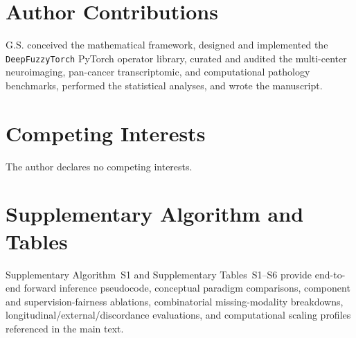 \documentclass[10pt,twocolumn]{article}
\begin{document}
\section*{Author Contributions}
G.S. conceived the mathematical framework, designed and implemented the \texttt{DeepFuzzyTorch}
PyTorch operator library, curated and audited the multi-center neuroimaging, pan-cancer
transcriptomic, and computational pathology benchmarks, performed the statistical analyses, and
wrote the manuscript.

\section*{Competing Interests}
The author declares no competing interests.

\FloatBarrier
\appendix
\section{Supplementary Algorithm and Tables}
\label{app:supp_tables}
\renewcommand{\thealgorithm}{S\arabic{algorithm}}
\setcounter{algorithm}{0}
\renewcommand{\thetable}{S\arabic{table}}
\setcounter{table}{0}
Supplementary Algorithm~S1 and Supplementary Tables~S1--S6 provide end-to-end forward inference
pseudocode, conceptual paradigm comparisons, component and supervision-fairness ablations,
combinatorial missing-modality breakdowns, longitudinal/external/discordance evaluations, and
computational scaling profiles referenced in the main text.
\end{document}
